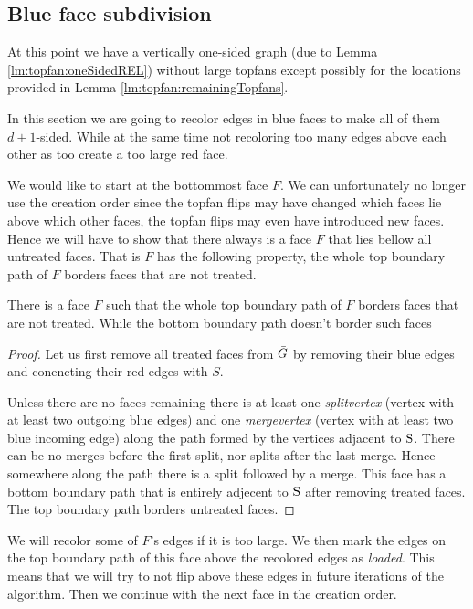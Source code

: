 
\subsection{Blue face subdivision}
\thispagestyle{plain}
\label{ss:subdiv}
  At this point we have a vertically one-sided graph (due to Lemma \ref{lm:topfan:oneSidedREL}) without large topfans except possibly for the locations provided in Lemma \ref{lm:topfan:remainingTopfans}.

  In this section we are going to recolor edges in blue faces to make all of them $d+1$-sided. While at the same time not recoloring too many edges above each other as too create a too large red face.

  We would like to start at the bottommost face $F$. We can unfortunately no longer use the creation order since the topfan flips may have changed which faces lie above which other faces, the topfan flips may even have introduced new faces. Hence we will have to show that there always is a face $F$  that lies bellow all untreated faces. That is $F$ has the following property, the whole top boundary path of $F$ borders faces that are not treated.

  \begin{lemma}
    \label{lm:}
    There is a face $F$ such that the whole top boundary path of $F$ borders faces that are not treated. While the bottom boundary path doesn't border such faces
  \end{lemma}
  \begin{proof}
    Let us first remove all treated faces from $\bar{G}$ by removing their blue edges and conencting their red edges with $S$.

    Unless there are no faces remaining there is at least one \emph{splitvertex} (vertex with at least two outgoing blue edges) and one \emph{mergevertex} (vertex with at least two blue incoming edge) along the path formed by the vertices adjacent to $\mathrm{S}$.
    There can be no merges before the first split, nor splits after the last merge.  Hence somewhere along the path there is a split followed by a merge. This face has a bottom boundary path that is entirely adjecent to $\mathrm{S}$ after removing treated faces. The top boundary path borders untreated faces.
  \end{proof}


  We will recolor some of $F$'s edges if it is too large.
  We then mark the edges on the top boundary path of this face above the recolored edges as \emph{loaded}. This means that we will try to not flip above these edges in future iterations of the algorithm.
  Then we continue with the next face in the creation order.

